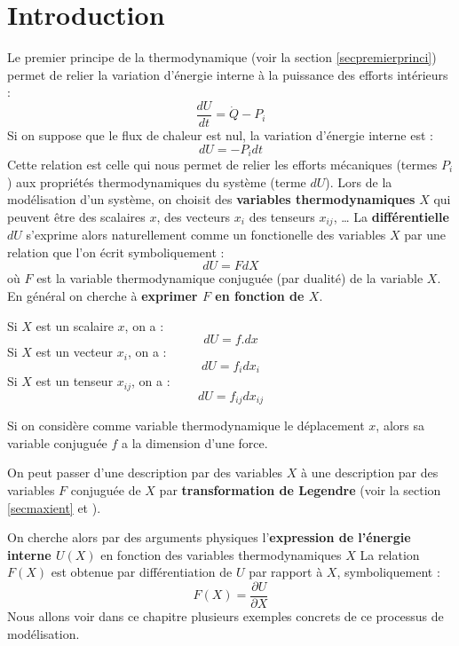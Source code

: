 \documentclass[12pt]{book}
\begin{document}
\section{Introduction}
Le premier principe de la thermodynamique (voir la section
\ref{secpremierprinci}) permet de relier la
variation d'\'energie interne \`a la puissance des
efforts int\'erieurs :
\begin{equation}
\frac{dU}{dt}=\dot Q -P_i
\end{equation}
Si on suppose que le flux de chaleur est nul, la variation d'\'energie
interne est :
\begin{equation}
dU=-P_i dt
\end{equation}
Cette relation est celle qui nous permet de relier les efforts
m\'ecaniques (termes $P_i$) aux propri\'et\'es thermodynamiques du
syst\`eme (terme $dU$).
Lors de la mod\'elisation d'un syst\`eme, on choisit des {\bf variables
thermodynamiques} $X$ qui peuvent \^etre des scalaires $x$, des
vecteurs $x_i$ des tenseurs $x_{ij}$, \dots
La {\bf diff\'erentielle $dU$} s'exprime alors naturellement comme un
fonctionelle des variables $X$ par une relation que l'on \'ecrit
symboliquement :
\begin{equation}
dU=FdX
\end{equation}
o\`u $F$ est la variable thermodynamique conjugu\'ee (par dualit\'e)
de la variable $X$.
En g\'en\'eral on cherche \`a {\bf exprimer $F$ en fonction de $X$}.
\begin{rem}
Si $X$ est un scalaire $x$, on a :
\begin{equation}
dU=f.dx
\end{equation}
Si $X$ est un vecteur $x_i$, on a :
\begin{equation}
dU=f_idx_i
\end{equation}
Si $X$ est un tenseur $x_{ij}$, on a :
\begin{equation}
dU=f_{ij}dx_{ij}
\end{equation}
\end{rem}
\begin{rem}
Si on consid\`ere comme variable thermodynamique le d\'eplacement $x$,
alors sa variable conjugu\'ee $f$ a la dimension d'une force.
\end{rem}
\begin{rem}
On peut passer d'une description par des variables $X$ \`a une
description par des variables $F$ conjugu\'ee de $X$ par
{\bf transformation de Legendre} (voir la section \ref{secmaxient} 
et \cite{ph:physt:Diu89}).
\end{rem}
On cherche alors par des arguments physiques l'{\bf expression de
l'\'energie interne $U(X)$} en fonction des
variables thermodynamiques $X$
La relation $F(X)$ est obtenue par diff\'erentiation de $U$ par
rapport \`a $X$, symboliquement :
\begin{equation}
F(X)=\frac{\partial U}{\partial X}
\end{equation}
Nous allons voir dans ce chapitre plusieurs exemples concrets de ce
processus de mod\'elisation.
\end{document}
